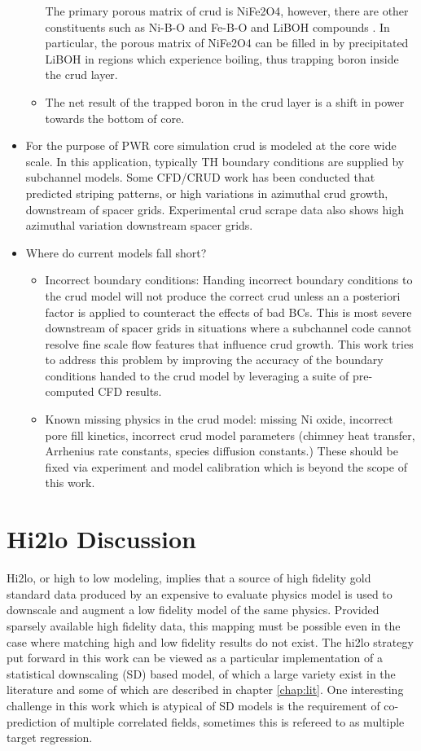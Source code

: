 \begin{itemize}
\begin{itemize}
	The primary porous matrix of crud is NiFe2O4, however, there are other constituents such as Ni-B-O and Fe-B-O and LiBOH compounds \cite{mongoose17}. In particular, the porous matrix of NiFe2O4 can be filled in by precipitated LiBOH in regions which experience boiling, thus trapping boron inside the crud layer.  
	\item The net result of the trapped boron in the crud layer is a shift in power towards the bottom of core.
\end{itemize}
\item For the purpose of PWR core simulation crud is modeled at the core wide scale.  In this application, typically TH boundary conditions are supplied by subchannel models.  Some CFD/CRUD work has been conducted that predicted striping patterns, or high variations in azimuthal crud growth, downstream of spacer grids.  Experimental crud scrape data also shows high azimuthal variation downstream spacer grids.
\item  Where do current models fall short?
\begin{itemize}
	\item Incorrect boundary conditions: Handing incorrect boundary conditions to the crud model will not produce the correct crud unless an a posteriori factor is applied to counteract the effects of bad BCs.  This is most severe downstream of spacer grids in situations where a subchannel code cannot resolve fine scale flow features that influence crud growth.  This work tries to address this problem by improving the accuracy of the boundary conditions handed to the crud model by leveraging a suite of pre-computed CFD results.
	\item Known missing physics in the crud model: missing Ni oxide, incorrect pore fill kinetics, incorrect crud model parameters (chimney heat transfer, Arrhenius rate constants, species diffusion constants.) These should be fixed via experiment and model calibration which is beyond the scope of this work.
\end{itemize}
\end{itemize}


\section{Hi2lo Discussion}

Hi2lo, or high to low modeling, implies that a source of high fidelity gold standard data produced by an expensive to evaluate physics model is used to downscale and augment a low fidelity model of the same physics.
Provided sparsely available high fidelity data, this mapping must be possible even in the case where matching high and low fidelity results do not exist.  The hi2lo strategy put forward in this work can be viewed as a particular implementation of a statistical downscaling (SD) based model, of which a large variety exist in the literature and some of which are described in chapter \ref{chap:lit}.  One interesting challenge in this work which is atypical of SD models is the requirement of co-prediction of multiple correlated fields, sometimes this is refereed to as multiple target regression.

